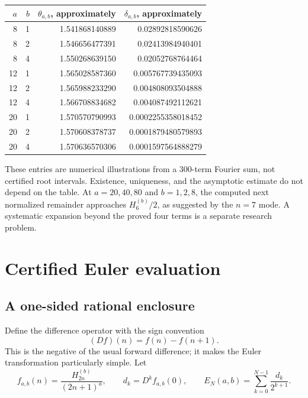 \begin{center}
\small
\begin{tabular}{@{}rrrr@{}}
\toprule
$a$ & $b$ & $\theta_{a,b}$, approximately & $\delta_{a,b}$, approximately\\
\midrule
8&1&1.541868140889&0.02892818590626\\
8&2&1.546656477391&0.02413984940401\\
8&4&1.550268639150&0.02052768764464\\
12&1&1.565028587360&0.005767739435093\\
12&2&1.565988233290&0.004808093504888\\
12&4&1.566708834682&0.004087492112621\\
20&1&1.570570790993&0.0002255358018452\\
20&2&1.570608378737&0.0001879480579893\\
20&4&1.570636570306&0.0001597564888279\\
\bottomrule
\end{tabular}
\end{center}
These entries are numerical illustrations from a 300-term Fourier sum, not certified root intervals. Existence, uniqueness, and the asymptotic estimate do not depend on the table. At $a=20,40,80$ and $b=1,2,8$, the computed next normalized remainder approaches $H_6^{(b)}/2$, as suggested by the $n=7$ mode. A systematic expansion beyond the proved four terms is a separate research problem.

\section{Certified Euler evaluation}
\label{signed:sec:euler}

\subsection{A one-sided rational enclosure}
Define the difference operator with the sign convention
\[
 (Df)(n)=f(n)-f(n+1).
\]
This is the negative of the usual forward difference; it makes the Euler transformation particularly simple. Let
\begin{equation}\label{signed:eq:euler-data}
 f_{a,b}(n)=\frac{H_{2n}^{(b)}}{(2n+1)^a},\qquad
 d_k=D^kf_{a,b}(0),\qquad
 E_N(a,b)=\sum_{k=0}^{N-1}\frac{d_k}{2^{k+1}}.
\end{equation}

